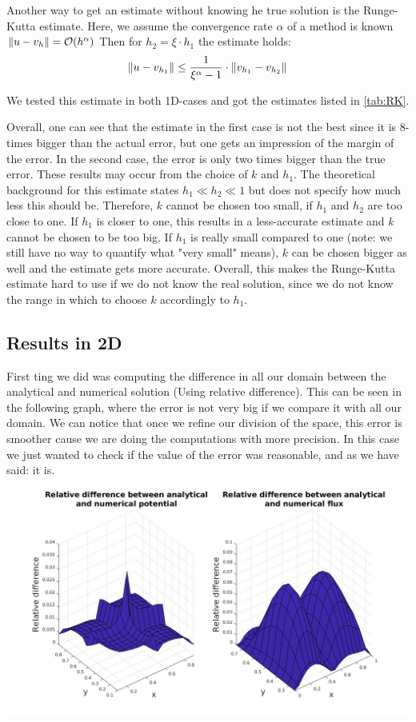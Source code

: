 \documentclass{article}
\begin{document}
	Another way to get an estimate without knowing he true solution is the Runge-Kutta estimate.
	Here, we assume the convergence rate $\alpha$ of a method is known $ \norm{u-v_h} = \mathcal{O}(h^\alpha)$
	Then for $h_2 = \xi\cdot h_1$ the estimate holds:
	\begin{equation*}
	\norm{u - v_{h_1}} \leq \frac{1}{\xi^\alpha -1} \cdot \norm {v_{h_1} - v_{h_2}}
	\end{equation*}
	
	We tested this estimate in both 1D-cases and got the estimates listed in \autoref{tab:RK}.
	
	Overall, one can see that the estimate in the first case is not the best since it is 8-times bigger than the actual error, but one gets an impression of the margin of the error.
	In the second case, the error is only two times bigger than the true error.
	These results may occur from the choice of $k$ and $h_1$.
	The theoretical background for this estimate states $h_1 \ll h_2 \ll 1$ but does not specify how much less this should be. 
	Therefore, $k$ cannot be chosen too small, if $h_1$ and $h_2$ are too close to one. 
	If $h_1$ is closer to one, this results in a less-accurate estimate and $k$ cannot be chosen to be too big. 
	If $h_1$ is really small compared to one (note: we still have no way to quantify what "very small" means), $k$ can be chosen bigger as well and the estimate gets more accurate.
	Overall, this makes the Runge-Kutta estimate hard to use if we do not know the real solution, since we do not know the range in which to choose $k$ accordingly to $h_1$.
	
	
	\subsection*{Results in 2D}
	First ting we did was computing the difference in all our domain between the analytical and numerical solution (Using relative difference). This can be seen in the following graph, where the error is not very big if we compare it with all our domain. We can notice that once we refine our division of the space, this error is smoother cause we are doing the computations with more precision. In this case we just wanted to check if the value of the error was reasonable, and as we have said: it is.
	
	\begin{center}
		\includegraphics[width = 0.9\linewidth]{../Images/relativeerror.jpg}
	\end{center}
	
\end{document}
